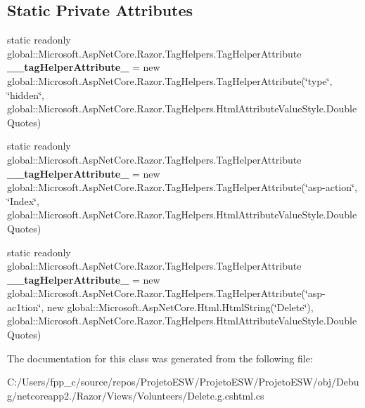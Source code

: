 \subsection*{Static Private Attributes}
\begin{DoxyCompactItemize}
\item 
\mbox{\label{class_asp_net_core_1_1_views___volunteers___delete_af25596b0dc75b38714c8dc60392dc3b1}} 
static readonly global\+::\+Microsoft.\+Asp\+Net\+Core.\+Razor.\+Tag\+Helpers.\+Tag\+Helper\+Attribute {\bfseries \+\_\+\+\_\+tag\+Helper\+Attribute\+\_} = new global\+::\+Microsoft.\+Asp\+Net\+Core.\+Razor.\+Tag\+Helpers.\+Tag\+Helper\+Attribute(\char`\"{}type\char`\"{}, \char`\"{}hidden\char`\"{}, global\+::\+Microsoft.\+Asp\+Net\+Core.\+Razor.\+Tag\+Helpers.\+Html\+Attribute\+Value\+Style.\+Double\+Quotes)
\item 
\mbox{\label{class_asp_net_core_1_1_views___volunteers___delete_a03813f1ca3e5d44731d3fb94a17262d4}} 
static readonly global\+::\+Microsoft.\+Asp\+Net\+Core.\+Razor.\+Tag\+Helpers.\+Tag\+Helper\+Attribute {\bfseries \+\_\+\+\_\+tag\+Helper\+Attribute\+\_} = new global\+::\+Microsoft.\+Asp\+Net\+Core.\+Razor.\+Tag\+Helpers.\+Tag\+Helper\+Attribute(\char`\"{}asp-\/action\char`\"{}, \char`\"{}Index\char`\"{}, global\+::\+Microsoft.\+Asp\+Net\+Core.\+Razor.\+Tag\+Helpers.\+Html\+Attribute\+Value\+Style.\+Double\+Quotes)
\item 
\mbox{\label{class_asp_net_core_1_1_views___volunteers___delete_a9cba6484f8a7515caa28293aecbbf286}} 
static readonly global\+::\+Microsoft.\+Asp\+Net\+Core.\+Razor.\+Tag\+Helpers.\+Tag\+Helper\+Attribute {\bfseries \+\_\+\+\_\+tag\+Helper\+Attribute\+\_} = new global\+::\+Microsoft.\+Asp\+Net\+Core.\+Razor.\+Tag\+Helpers.\+Tag\+Helper\+Attribute(\char`\"{}asp-\/ac1tion\char`\"{}, new global\+::\+Microsoft.\+Asp\+Net\+Core.\+Html.\+Html\+String(\char`\"{}Delete\char`\"{}), global\+::\+Microsoft.\+Asp\+Net\+Core.\+Razor.\+Tag\+Helpers.\+Html\+Attribute\+Value\+Style.\+Double\+Quotes)
\end{DoxyCompactItemize}


The documentation for this class was generated from the following file\+:\begin{DoxyCompactItemize}
\item 
C\+:/\+Users/fpp\+\_\+c/source/repos/\+Projeto\+E\+S\+W/\+Projeto\+E\+S\+W/\+Projeto\+E\+S\+W/obj/\+Debug/netcoreapp2./\+Razor/\+Views/\+Volunteers/Delete.\+g.\+cshtml.\+cs\end{DoxyCompactItemize}
